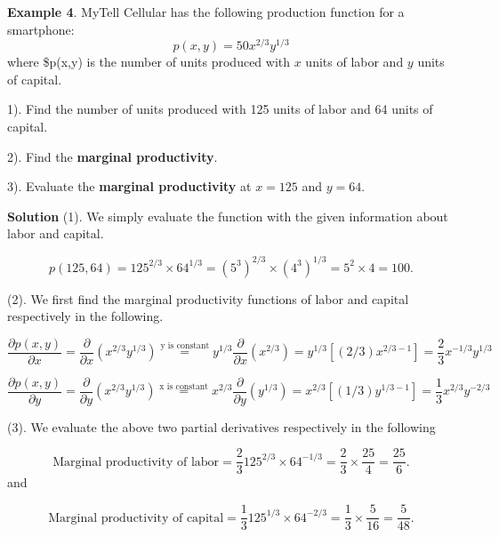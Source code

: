 \documentclass[
]{book}
\begin{document}
\hfill\break

\textbf{Example 4}. MyTell Cellular has the following production function for a smartphone:
\[
p(x, y)=50x^{2/3} y^{1/3}
\]
where \$p(x,y) is the number of units produced with \(x\) units of labor and \(y\) units of capital.

1). Find the number of units produced with 125 units of labor and 64 units of capital.

2). Find the \textbf{marginal productivity}.

3). Evaluate the \textbf{marginal productivity} at \(x=125\) and \(y = 64\).

\textbf{Solution} (1). We simply evaluate the function with the given information about labor and capital.

\[
p(125,64) = 125^{2/3}\times 64^{1/3} = (5^3)^{2/3} \times (4^3)^{1/3} = 5^2\times 4  = 100.
\]

(2). We first find the marginal productivity functions of labor and capital respectively in the following.

\[
 \frac{\partial p(x,y)}{\partial x} = \frac{\partial}{\partial x}(x^{2/3}y^{1/3}) \stackrel{\text{y is constant}}{=} y^{1/3}\frac{\partial}{\partial x}(x^{2/3}) = y^{1/3}[(2/3)x^{2/3-1}] = \frac{2}{3}x^{-1/3}y^{1/3}
\]

\[
 \frac{\partial p(x,y)}{\partial y} = \frac{\partial}{\partial y}(x^{2/3}y^{1/3}) \stackrel{\text{x is constant}}{=} x^{2/3}\frac{\partial}{\partial y}(y^{1/3}) = x^{2/3}[(1/3)y^{1/3-1}] = \frac{1}{3}x^{2/3}y^{-2/3}
\]

(3). We evaluate the above two partial derivatives respectively in the following

\[
  \text{Marginal productivity of labor} = \frac{2}{3}125^{2/3}\times 64^{-1/3} = \frac{2}{3}\times\frac{25}{4} = \frac{25}{6}.
\]
and

\[
  \text{Marginal productivity of capital} = \frac{1}{3}125^{1/3}\times 64^{-2/3} = \frac{1}{3}\times\frac{5}{16} = \frac{5}{48}.
\]

  
\end{document}
